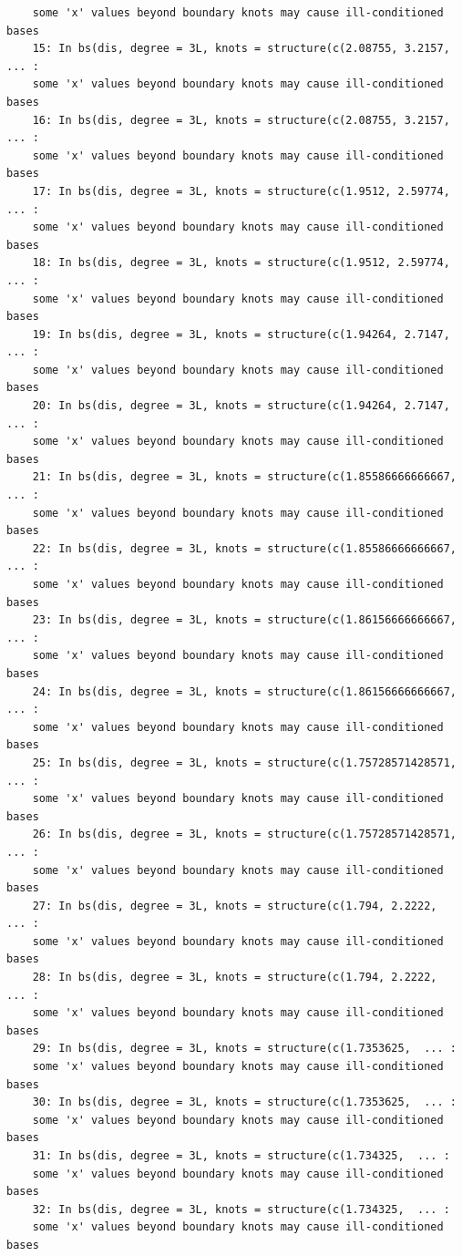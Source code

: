\documentclass{article}
\begin{document}
\begin{program}
\begin{verbatim}
	some 'x' values beyond boundary knots may cause ill-conditioned bases
	15: In bs(dis, degree = 3L, knots = structure(c(2.08755, 3.2157,  ... :
	some 'x' values beyond boundary knots may cause ill-conditioned bases
	16: In bs(dis, degree = 3L, knots = structure(c(2.08755, 3.2157,  ... :
	some 'x' values beyond boundary knots may cause ill-conditioned bases
	17: In bs(dis, degree = 3L, knots = structure(c(1.9512, 2.59774,  ... :
	some 'x' values beyond boundary knots may cause ill-conditioned bases
	18: In bs(dis, degree = 3L, knots = structure(c(1.9512, 2.59774,  ... :
	some 'x' values beyond boundary knots may cause ill-conditioned bases
	19: In bs(dis, degree = 3L, knots = structure(c(1.94264, 2.7147,  ... :
	some 'x' values beyond boundary knots may cause ill-conditioned bases
	20: In bs(dis, degree = 3L, knots = structure(c(1.94264, 2.7147,  ... :
	some 'x' values beyond boundary knots may cause ill-conditioned bases
	21: In bs(dis, degree = 3L, knots = structure(c(1.85586666666667,  ... :
	some 'x' values beyond boundary knots may cause ill-conditioned bases
	22: In bs(dis, degree = 3L, knots = structure(c(1.85586666666667,  ... :
	some 'x' values beyond boundary knots may cause ill-conditioned bases
	23: In bs(dis, degree = 3L, knots = structure(c(1.86156666666667,  ... :
	some 'x' values beyond boundary knots may cause ill-conditioned bases
	24: In bs(dis, degree = 3L, knots = structure(c(1.86156666666667,  ... :
	some 'x' values beyond boundary knots may cause ill-conditioned bases
	25: In bs(dis, degree = 3L, knots = structure(c(1.75728571428571,  ... :
	some 'x' values beyond boundary knots may cause ill-conditioned bases
	26: In bs(dis, degree = 3L, knots = structure(c(1.75728571428571,  ... :
	some 'x' values beyond boundary knots may cause ill-conditioned bases
	27: In bs(dis, degree = 3L, knots = structure(c(1.794, 2.2222,  ... :
	some 'x' values beyond boundary knots may cause ill-conditioned bases
	28: In bs(dis, degree = 3L, knots = structure(c(1.794, 2.2222,  ... :
	some 'x' values beyond boundary knots may cause ill-conditioned bases
	29: In bs(dis, degree = 3L, knots = structure(c(1.7353625,  ... :
	some 'x' values beyond boundary knots may cause ill-conditioned bases
	30: In bs(dis, degree = 3L, knots = structure(c(1.7353625,  ... :
	some 'x' values beyond boundary knots may cause ill-conditioned bases
	31: In bs(dis, degree = 3L, knots = structure(c(1.734325,  ... :
	some 'x' values beyond boundary knots may cause ill-conditioned bases
	32: In bs(dis, degree = 3L, knots = structure(c(1.734325,  ... :
	some 'x' values beyond boundary knots may cause ill-conditioned bases

\end{verbatim}
\end{program}
\end{document}
